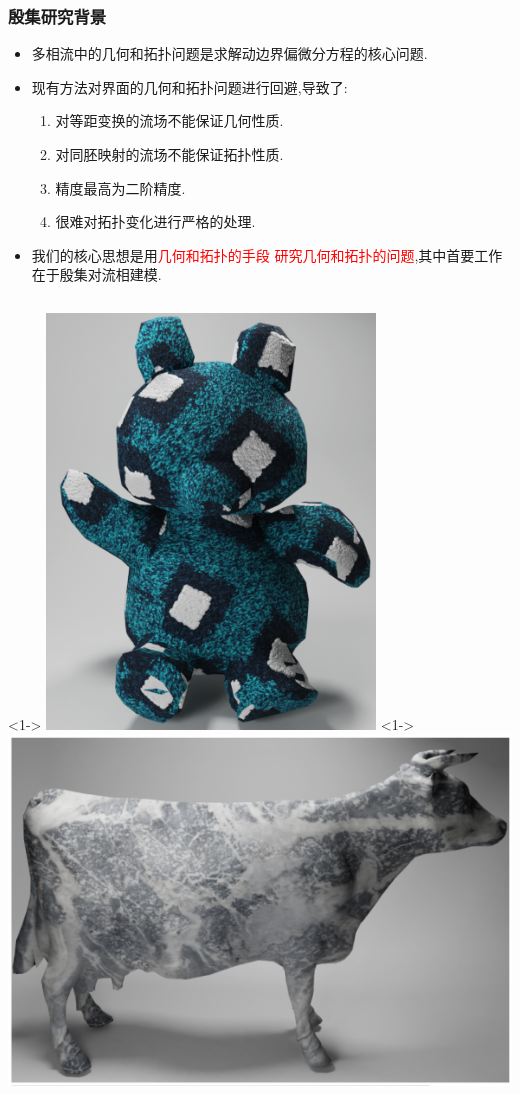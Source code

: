 \documentclass[UTF8]{ctexbeamer}	%
\theoremstyle{plain}
\theoremstyle{definition}
\theoremstyle{remark}
\numberwithin{equation}{section}
\begin{document}
\begin{frame}
    \frametitle{殷集研究背景}
    \begin{itemize}
        \item 多相流中的几何和拓扑问题是求解动边界偏微分方程的核心问题.
        \item 现有方法对界面的几何和拓扑问题进行回避,导致了:
              \begin{enumerate}
                  \item 对等距变换的流场不能保证几何性质.
                  \item 对同胚映射的流场不能保证拓扑性质.
                  \item 精度最高为二阶精度.
                  \item 很难对拓扑变化进行严格的处理.
              \end{enumerate}
        \item 我们的核心思想是用\textcolor{red}{几何和拓扑的手段
                  研究几何和拓扑的问题},其中首要工作在于殷集对流相建模.
    \end{itemize}
    \begin{columns}
        <1->
        \centering
        \includegraphics[width = .6\textwidth]{fig/s18.png}
        <1->
        \centering
        \includegraphics[width = .7\textwidth]{fig/s19.png}
    \end{columns}
\end{frame}
\end{document}
